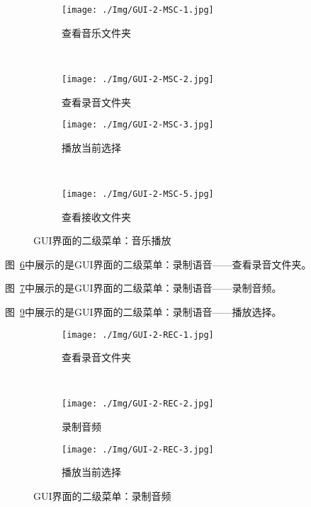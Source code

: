 \begin{figure}[!htbp]
	\centering
	\begin{subfigure}[c]{0.4\textwidth}
		\texttt{[image: ./Img/GUI-2-MSC-1.jpg]}
		\caption{查看音乐文件夹}
		\label{GUI-2-MSC-1.jpg}
	\end{subfigure}%
	~
	\begin{subfigure}[c]{0.4\textwidth}
		\texttt{[image: ./Img/GUI-2-MSC-2.jpg]}
		\caption{查看录音文件夹}
		\label{GUI-2-MSC-2.jpg}
	\end{subfigure}%
	
	\begin{subfigure}[c]{0.4\textwidth}
		\texttt{[image: ./Img/GUI-2-MSC-3.jpg]}
		\caption{播放当前选择}
		\label{GUI-2-MSC-3.jpg}
	\end{subfigure}
	~
	\begin{subfigure}[c]{0.4\textwidth}
		\texttt{[image: ./Img/GUI-2-MSC-5.jpg]}
		\caption{查看接收文件夹}
		\label{GUI-2-MSC-5.jpg}
	\end{subfigure}
	\caption{GUI界面的二级菜单：音乐播放}
\end{figure}

图~\ref{GUI-2-REC-1.jpg}中展示的是GUI界面的二级菜单：录制语音——查看录音文件夹。


图~\ref{GUI-2-REC-2.jpg}中展示的是GUI界面的二级菜单：录制语音——录制音频。


图~\ref{GUI-2-REC-3.jpg}中展示的是GUI界面的二级菜单：录制语音——播放选择。

\begin{figure}[!htbp]
	\centering
	\begin{subfigure}[c]{0.4\textwidth}
		\texttt{[image: ./Img/GUI-2-REC-1.jpg]}
		\caption{查看录音文件夹}
		\label{GUI-2-REC-1.jpg}
	\end{subfigure}%
	~
	\begin{subfigure}[c]{0.4\textwidth}
		\texttt{[image: ./Img/GUI-2-REC-2.jpg]}
		\caption{录制音频}
		\label{GUI-2-REC-2.jpg}
	\end{subfigure}%

	\begin{subfigure}[c]{0.4\textwidth}
		\texttt{[image: ./Img/GUI-2-REC-3.jpg]}
		\caption{播放当前选择}
		\label{GUI-2-REC-3.jpg}
	\end{subfigure}
	\caption{GUI界面的二级菜单：录制音频}
\end{figure}


